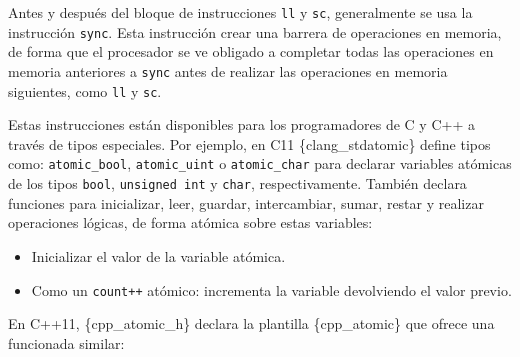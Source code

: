 Antes y después del bloque de instrucciones \texttt{ll} y \texttt{sc},
generalmente se usa la instrucción \texttt{sync}. Esta instrucción crear
una barrera de operaciones en memoria, de forma que el procesador se ve
obligado a completar todas las operaciones en memoria anteriores a
\texttt{sync} antes de realizar las operaciones en memoria siguientes,
como \texttt{ll} y \texttt{sc}.

Estas instrucciones están disponibles para los programadores de C y C++
a través de tipos especiales. Por ejemplo, en C11 \{clang\_stdatomic\}
define tipos como: \texttt{atomic\_bool}, \texttt{atomic\_uint} o
\texttt{atomic\_char} para declarar variables atómicas de los tipos
\texttt{bool}, \texttt{unsigned\ int} y \texttt{char}, respectivamente.
También declara funciones para inicializar, leer, guardar, intercambiar,
sumar, restar y realizar operaciones lógicas, de forma atómica sobre
estas variables:

\begin{Shaded}
\begin{Highlighting}[]
\OperatorTok{;}
\OperatorTok{(\&}\OperatorTok{,} \OperatorTok{);} 
\OperatorTok{=}\OperatorTok{(\&}\OperatorTok{,} \OperatorTok{);} 
\end{Highlighting}
\end{Shaded}

\begin{itemize}
\item
  Inicializar el valor de la variable atómica.
\item
  Como un \texttt{count++} atómico: incrementa la variable devolviendo
  el valor previo.
\end{itemize}

En C++11, \{cpp\_atomic\_h\} declara la plantilla \{cpp\_atomic\} que
ofrece una funcionada similar:

\begin{Shaded}
\begin{Highlighting}[]
\OperatorTok{\textless{}}\OperatorTok{\textgreater{}}\OperatorTok{\{}\OperatorTok{\};}  
\OperatorTok{=}\OperatorTok{++;}     
\end{Highlighting}
\end{Shaded}

